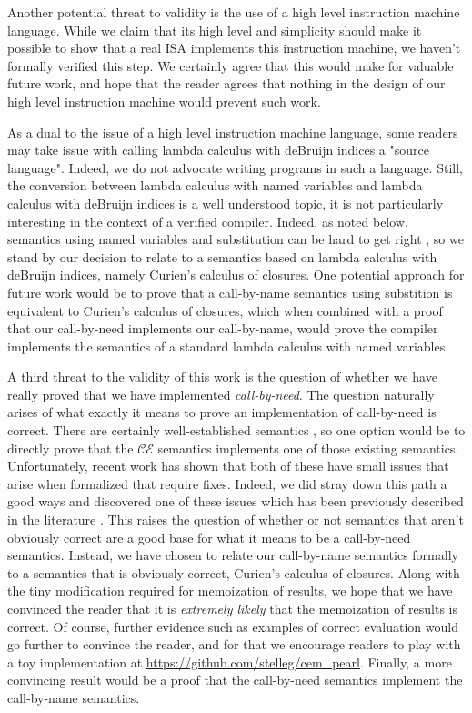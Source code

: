 Another potential threat to validity is the use of a high level instruction
machine language. While we claim that its high level and simplicity should make
it possible to show that a real ISA implements this instruction machine, we
haven't formally verified this step. We certainly agree that this would make for
valuable future work, and hope that the reader agrees that nothing in the design
of our high level instruction machine would prevent such work.

As a dual to the issue of a high level instruction machine language, some
readers may take issue with calling lambda calculus with deBruijn indices a
"source language". Indeed, we do not advocate writing programs in such a
language. Still, the conversion between lambda calculus with named variables and
lambda calculus with deBruijn indices is a well understood topic, it is not
particularly interesting in the context of a verified compiler.  Indeed, as
noted below, semantics using named variables and substitution can be
hard to get right \cite{breitnerthesis, nakata2009small}, so we stand by our
decision to relate to a semantics based on lambda calculus with deBruijn
indices, namely Curien's calculus of closures. One potential approach for future
work would be to prove that a call-by-name semantics using substition is
equivalent to Curien's calculus of closures, which when combined with a proof
that our call-by-need implements our call-by-name, would prove the compiler
implements the semantics of a standard lambda calculus with named variables.

A third threat to the validity of this work is the question of whether 
we have really proved that we have implemented \emph{call-by-need}. The question
naturally arises of what exactly it means to prove an implementation of
call-by-need is correct. There are certainly well-established semantics
\cite{launchburynatural, ariola1995call}, so one option would be to directly
prove that the $\mathcal{CE}$ semantics implements one of those existing
semantics.  Unfortunately, recent work has shown that both of these have small
issues that arise when formalized that require fixes. Indeed, we did stray down
this path a good ways and discovered one of these issues which has been
previously described in the literature \cite{nakata2009small}. This raises the
question of whether or not semantics that aren't obviously correct are a good
base for what it means to be a call-by-need semantics. Instead, we have chosen to
relate our call-by-name semantics formally to a semantics that is obviously
correct, Curien's calculus of closures. Along with the tiny modification
required for memoization of results, we hope that we have convinced the reader
that it is \emph{extremely likely} that the memoization of results is correct.
Of course, further evidence such as examples of correct evaluation would go
further to convince the reader, and for that we encourage readers to
play with a toy implementation at \url{https://github.com/stelleg/cem\_pearl}.
Finally, a more convincing result would be a proof that the call-by-need
semantics implement the call-by-name semantics. 

